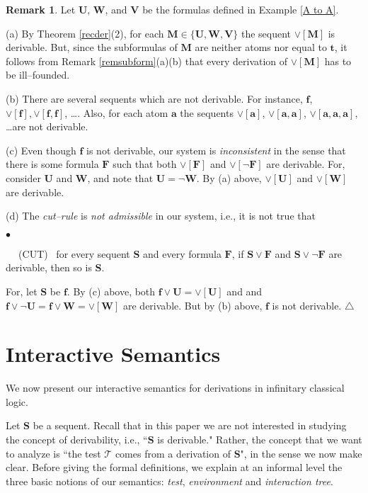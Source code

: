 \documentclass[copyright,creativecommons]{eptcs}
\def\ie{i.e., }
\newcommand{\cT}{\mathcal{T}}
\newcommand{\TRUE}{\pmb{t}}
\newcommand{\FALSE}{\pmb{f}}
\newcommand{\bF}{\mathbf{F}}
\newcommand{\bS}{\mathbf{S}}
\newcommand{\bU}{\mathbf{U}}
\newcommand{\bW}{\mathbf{W}}
\newcommand{\bV}{\mathbf{V}}
\newcommand{\bba}{\mathbf{a}}
\theoremstyle{definition}
\newtheorem{remark}[theorem]{Remark}
\newcommand{\squishlist}{
 \begin{list}{$\bullet$}
  { \setlength{\itemsep}{0pt}
     \setlength{\parsep}{3pt}
     \setlength{\topsep}{3pt}
     \setlength{\partopsep}{0pt}
     \setlength{\leftmargin}{1em}
     \setlength{\labelwidth}{1.5em}
     \setlength{\labelsep}{0.5em} } }
\newcommand{\squishend}{
  \end{list}  }
\begin{document}
\begin{remark} \label{remcons} Let  $\bU$, $\mathbf{W}$, and $\bV$ be the formulas defined   in Example \ref{A to A}.

(a) By  Theorem \ref{recder}(2),  for each $\mathbf{M}\in \{ \bU, \mathbf{W},\bV\}$
the sequent $\vee[\mathbf{M}]$
 is derivable.
But, since the  subformulas of $\mathbf{M}$  are neither atoms nor equal to $\TRUE$,       it follows from Remark \ref{remsubform}(a)(b) that
every derivation of  $\vee[\mathbf{M}]$ has to be ill--founded.

(b)  There are several sequents which are not derivable. For instance,
 $\FALSE$, $\vee[\FALSE], \vee[\FALSE,\FALSE]$, \ldots. Also, for each atom $\bba$  the sequents  $\vee[\bba]$,
 $\vee[\bba,\bba]$, $\vee[\bba,\bba,\bba]$,
 \ldots are not derivable.

(c) Even though $\FALSE$ is not derivable, our system is \emph{inconsistent}
in the sense that there is some formula $\bF$ such that
both  $\vee[\bF]$ and $\vee[\neg\bF]$ are derivable.
For, consider  $\bU$ and $\mathbf{W}$, and note that $\bU = \neg\mathbf{W}$. By (a) above, $ \vee[\bU]$ and
 $ \vee[\bW]$
are derivable.

(d) The \emph{cut--rule} is \emph{not admissible} in our
system, \ie it is not true that
\squishlist
\item[$\phantom{ab}$ (CUT)] \ for every sequent $\bS$ and every formula $\bF$,
if $\bS \vee \bF$
and $\bS \vee \neg \bF$ are  derivable, then so is
$\bS$.
\squishend
For, let $\bS$ be $\FALSE$.
By (c) above, both   $\FALSE\vee \bU = \vee[\bU]$ and
and $\FALSE\vee \neg \bU = \FALSE\vee \mathbf{W}   = \vee[\mathbf{W} ]$
are derivable. But by (b) above, $\FALSE$ is not derivable.
 \hfill$\triangle$
\end{remark}





\section{Interactive Semantics} \label{sec4}

We now present our interactive semantics
for derivations in infinitary classical logic.

Let $\bS$ be a sequent.
Recall that in this paper
we are not interested
in studying the concept of derivability, \ie  ``$\bS$ is derivable." Rather,
the concept that we want to  analyze is    ``the test $\cT$ comes from a derivation
of \/$\bS$", in the sense we now make clear.
Before giving the formal definitions, we explain at an informal  level the
 three basic notions of our semantics:
\emph{test}, \emph{environment} and \emph{interaction tree}. \\
\end{document}
